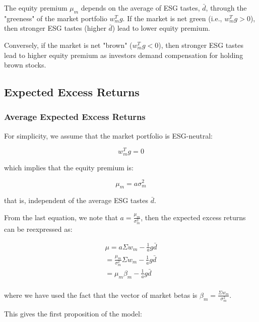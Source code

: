 The equity premium $\mu_m$ depends on the average of ESG tastes, $\bar{d}$,
through the "greeness" of the market portfolio $w_m^T g$.
If the market is net green (i.e., $w_m^T g > 0$), then stronger 
ESG tastes (higher $\bar{d}$) lead to lower equity premium.

Conversely, if the market is net "brown" ($w_m^T g < 0$), then stronger
ESG tastes lead to higher equity premium as investors demand 
compensation for holding brown stocks.


\subsection{Expected Excess Returns}

\subsubsection{Average Expected Excess Returns}

For simplicity, we assume that the market portfolio is ESG-neutral:

\begin{equation}
    w_m^T g = 0
\end{equation}

which implies that the equity premium is:

\begin{equation}
    \mu_m = a \sigma_m^2
\end{equation}

that is, independent of the average ESG tastes $\bar{d}$.

From the last equation, we note that $a = \frac{\mu_m}{\sigma_m^2}$, then 
the expected excess returns can be reexpressed as: 

\begin{equation}
    \begin{aligned}
        \mu = a \Sigma w_m - \frac{1}{a} g \bar{d} \\
        = \frac{\mu_m}{\sigma_m^2} \Sigma w_m - \frac{1}{a} g \bar{d} \\
        = \mu_m \beta_m - \frac{1}{a} g \bar{d} \\
    \end{aligned}
\end{equation}

where we have used the fact that the 
vector of market betas is $\beta_m = \frac{\Sigma w_m}{\sigma_m^2}$.

This gives the first proposition of the model:

